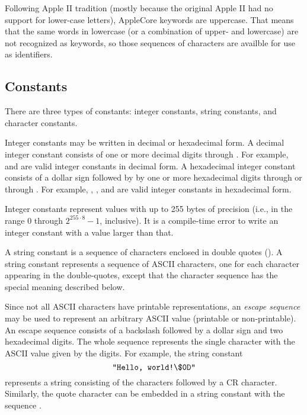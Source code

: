 \documentclass[10pt]{article}
\begin{document}
Following Apple II tradition (mostly because the original Apple II had
no support for lower-case letters), AppleCore keywords are uppercase.
That means that the same words in lowercase (or a combination of
upper- and lowercase) are not recognized as keywords, so those
sequences of characters are availble for use as identifiers.

\subsection{Constants}
\label{sec:lexical:constants}

There are three types of constants: integer constants, string
constants, and character constants.  

  Integer constants may be written in
decimal or hexadecimal form.  A decimal integer constant consists of
one or more decimal digits  through .  For example,
 and  are valid integer constants in decimal form.  A
hexadecimal integer constant consists of a dollar sign \kwd{\$}
followed by by one or more hexadecimal digits  through 
or  through .  For example, , , and
 are valid integer constants in hexadecimal form.

Integer constants represent values with up to 255 bytes of precision
(i.e., in the range $0$ through $2^{255 \cdot 8}-1$, inclusive).  It
is a compile-time error to write an integer constant with a value
larger than that.

 A string constant is a sequence of
characters enclosed in double quotes ().  A string constant
represents a sequence of ASCII characters, one for each character
appearing in the double-quotes, except that the character sequence
\kwd{\bs\$} has the special meaning described below.

Since not all ASCII characters have printable representations, an
\emph{escape sequence} may be used to represent an arbitrary ASCII
value (printable or non-printable).  An escape sequence consists of a
backslash \kwd{\bs} followed by a dollar sign \kwd{\$} and two
hexadecimal digits.  The whole sequence represents the single
character with the ASCII value given by the digits.  For example, the
string constant
%
$$\texttt{"Hello, world!\textbackslash\$0D"}$$
%
represents a string consisting of the characters 
followed by a CR character.  Similarly, the quote character 
can be embedded in a string constant with the sequence .
\end{document}
